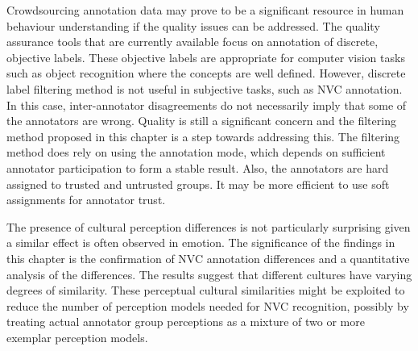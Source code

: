 Crowdsourcing annotation data may prove to be a significant resource in human behaviour understanding if the quality issues can be addressed. The quality assurance tools that are currently available focus on annotation of discrete, objective labels. These objective labels are appropriate for computer vision tasks such as object recognition where the concepts are well defined. 
However, discrete label filtering method is not useful in subjective tasks, such as \ac{NVC} annotation. In this case, inter-annotator disagreements do not necessarily imply that some of the annotators are wrong. Quality is still a significant concern and the filtering method proposed in this chapter is a step towards addressing this. The filtering method does rely on using the annotation mode, which depends on sufficient annotator participation to form a stable result. Also, the annotators are hard assigned to trusted and untrusted groups. It may be more efficient to use soft assignments for annotator trust.

The presence of cultural perception differences is not particularly surprising given a similar effect is often observed in emotion. The significance of the findings in this chapter is the confirmation of \ac{NVC} annotation differences and a quantitative analysis of the differences. The results suggest that different cultures have varying degrees of similarity. These perceptual cultural similarities might be exploited to reduce the number of \culturallySpecific perception models needed for \ac{NVC} recognition, possibly by treating actual annotator group perceptions as a mixture of two or more exemplar perception models.

